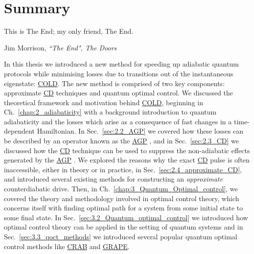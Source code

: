 \documentclass[a4paper,oneside,11pt]{book}
\newcommand{\acrref}[1]{\hyperref[acr:#1]{#1}}
\begin{document}
\chapter{Summary}\label{chap:8_Summary}

\epigraph{This is The End; my only friend, The End.}{Jim Morrison,
\emph{``The End", The Doors}}

In this thesis we introduced a new method for speeding up adiabatic quantum protocols while minimising losses due to transitions out of the instantaneous eigenstate: \acrref{COLD}. The new method is comprised of two key components: approximate \acrref{CD} techniques and quantum optimal control. We discussed the theoretical framework and motivation behind \acrref{COLD}, beginning in Ch.~\ref{chap:2_adiabaticity} with a background introduction to quantum adiabaticity and the losses which arise as a consequence of fast changes in a time-dependent Hamiltonian. In Sec.~\ref{sec:2.2_AGP} we covered how these losses can be described by an operator known as the \acrref{AGP} \cite{kolodrubetz_geometry_2017}, and in Sec.~\ref{sec:2.3_CD} we discussed how the \acrref{CD} technique can be used to suppress the non-adiabatic effects generated by the \acrref{AGP} \cite{berry_transitionless_2009, demirplak_adiabatic_2003}. We explored the reasons why the exact \acrref{CD} pulse is often inaccessible, either in theory or in practice, in Sec.~\ref{sec:2.4_approximate_CD}, and introduced several existing methods for constructing an \emph{approximate} counterdiabatic drive. Then, in Ch.~\ref{chap:3_Quantum_Optimal_control}, we covered the theory and methodology involved in optimal control theory, which concerns itself with finding optimal path for a system from some initial state to some final state. In Sec.~\ref{sec:3.2_Quantum_optimal_control} we introduced how optimal control theory can be applied in the setting of quantum systems and in Sec.~\ref{sec:3.3_qoct_methods} we introduced several popular quantum optimal control methods like \acrref{CRAB} and \acrref{GRAPE}. 
\end{document}
